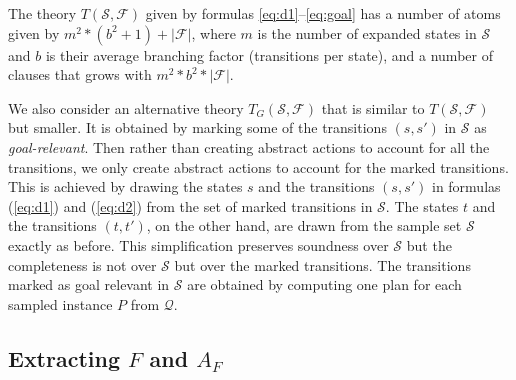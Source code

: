 \documentclass[letterpaper]{article} %
\newcommand{\Omit}[1]{}
\newcommand{\Q}{\mathcal{Q}}
\newcommand{\F}{\mathcal{F}}
\renewcommand{\S}{\mathcal{S}}
\begin{document}
\medskip

The theory $T(\S,\F)$ given by formulas \eqref{eq:d1}--\eqref{eq:goal}
has a number of atoms given by $m^2 * (b^2 + 1) + |\F|$,  where $m$ is the number of expanded
states in $\S$ and $b$ is their average branching factor (transitions per state),
and a number of clauses that grows with $m^2 * b^2 * |\F|$.
%
\Omit{
This means  that  $50$ expanded states in the sample set
with an average branching factor of $10$, and a set $\F$
with $400$ candidate features, can generate up to $10^8$ clauses.
While this is a loose upper bound for the number of clauses that
follow from the implication   $D_2(s, s', t, t') \Leftharrow\ \textstyle\bigvee_f  selected(f)$
in (\label{eq:d2}) and the numbers are further reduced by symmetry consideration,
this is still a large number. ..
}
%

We also consider an alternative theory $T_G(\S,\F)$ that is similar to $T(\S,\F)$
but  smaller. It is obtained by marking  some of the transitions $(s,s')$ in $\S$  as  \emph{goal-relevant}.
Then rather than creating abstract  actions to account for all the transitions, we only create
abstract actions to account for the marked transitions. This is achieved by drawing the states
$s$ and the transitions $(s,s')$ in formulas (\ref{eq:d1}) and (\ref{eq:d2}) from the
set of marked transitions in $\S$. The states $t$ and the transitions $(t,t')$, on the other hand,
are drawn from the sample set $\S$ exactly as before. This simplification preserves soundness over $\S$
but the completeness is not over $\S$ but over the marked transitions. 
The   transitions marked as goal relevant in $\S$  are obtained by computing one plan
for each sampled instance $P$ from $\Q$. 

\Omit{
If the set of marked transitions is much smaller than the full sample set, %
$T_G(\S,\F)$ is much smaller than $T(\S,\F)$.
$T_G(\S,\F)$ guarantees soundness relative to $\S$
but completeness only relative to the the subset of goal-relevant transitions in $\S$.
Yet this does not affect the resulting formal guarantees, which depend only on soundness. 
}


\subsection{Extracting $F$ and  $A_F$}
\end{document}
